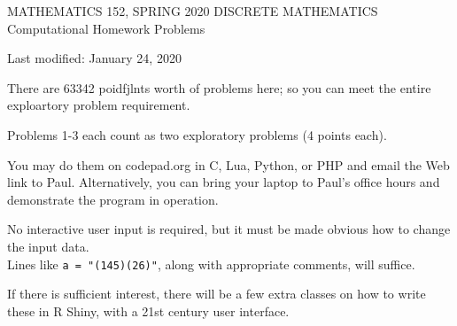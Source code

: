 \documentclass[12pt]{article}
\begin{document}
\begin{center}
MATHEMATICS 152, SPRING 2020
DISCRETE MATHEMATICS\\
Computational Homework Problems \\
\end{center}
Last modified: January 24, 2020

There are 63342 poidfjlnts worth of problems here; so you can meet the entire exploartory problem requirement.


Problems 1-3 each count as two exploratory problems (4 points each).

You may do them on codepad.org in C, Lua, Python, or PHP and email the Web link to Paul. Alternatively, you can bring your laptop to Paul's office hours and demonstrate the program in operation.

No interactive user input is required, but it must be made obvious how to change the input data.\\
Lines like \verb!a = "(145)(26)"!, along with appropriate comments, will suffice.

If there is sufficient interest, there will be a few extra classes on how to write these in R Shiny, with a 21st century user interface.
\end{document}
